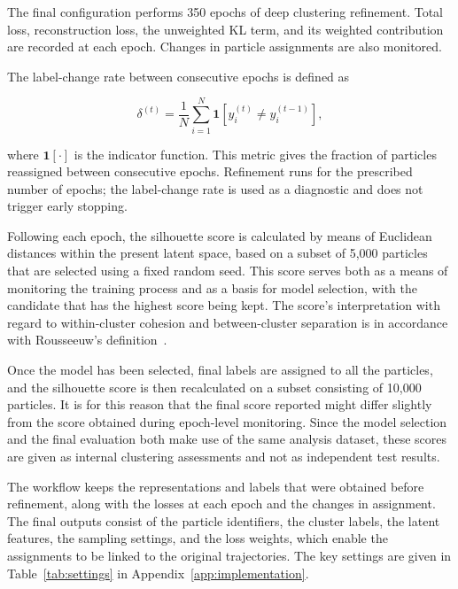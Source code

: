 The final configuration performs 350 epochs of deep clustering refinement. Total loss, reconstruction loss, the unweighted KL term, and its weighted contribution are recorded at each epoch. Changes in particle assignments are also monitored.

The label-change rate between consecutive epochs is defined as

\begin{equation} \delta^{(t)} = \frac{1}{N} \sum_{i=1}^{N} \mathbf{1} \left[ y_i^{(t)}\neq y_i^{(t-1)} \right], \end{equation}

where \(\mathbf{1}[\cdot]\) is the indicator function. This metric gives the fraction of particles reassigned between consecutive epochs. Refinement runs for the prescribed number of epochs; the label-change rate is used as a diagnostic and does not trigger early stopping.

Following each epoch, the silhouette score is calculated by means of Euclidean distances within the present latent space, based on a subset of 5,000 particles that are selected using a fixed random seed. This score serves both as a means of monitoring the training process and as a basis for model selection, with the candidate that has the highest score being kept. The score's interpretation with regard to within-cluster cohesion and between-cluster separation is in accordance with Rousseeuw's definition~\cite{rousseeuw1987}.

Once the model has been selected, final labels are assigned to all the particles, and the silhouette score is then recalculated on a subset consisting of 10,000 particles. It is for this reason that the final score reported might differ slightly from the score obtained during epoch-level monitoring. Since the model selection and the final evaluation both make use of the same analysis dataset, these scores are given as internal clustering assessments and not as independent test results.

The workflow keeps the representations and labels that were obtained before refinement, along with the losses at each epoch and the changes in assignment. The final outputs consist of the particle identifiers, the cluster labels, the latent features, the sampling settings, and the loss weights, which enable the assignments to be linked to the original trajectories. The key settings are given in Table~\ref{tab:settings} in Appendix~\ref{app:implementation}.
